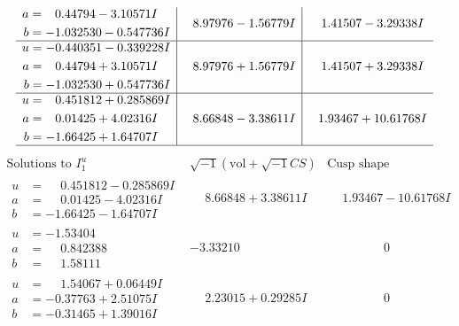 \documentclass[1p]{elsarticle_modified}
\theoremstyle{definition}
\newcommand{\I}{\sqrt{-1}}
\begin{document}
$$\begin{array}{c|c|c}
\begin{aligned}
a &= \phantom{-}0.44794 - 3.10571 I \\
b &= -1.032530 - 0.547736 I\end{aligned}
 & \phantom{-}8.97976 - 1.56779 I & \phantom{-}1.41507 - 3.29338 I \\ \hline\begin{aligned}
u &= -0.440351 - 0.339228 I \\
a &= \phantom{-}0.44794 + 3.10571 I \\
b &= -1.032530 + 0.547736 I\end{aligned}
 & \phantom{-}8.97976 + 1.56779 I & \phantom{-}1.41507 + 3.29338 I \\ \hline\begin{aligned}
u &= \phantom{-}0.451812 + 0.285869 I \\
a &= \phantom{-}0.01425 + 4.02316 I \\
b &= -1.66425 + 1.64707 I\end{aligned}
 & \phantom{-}8.66848 - 3.38611 I & \phantom{-}1.93467 + 10.61768 I\\
 \hline 
 \end{array}$$\newpage$$\begin{array}{c|c|c}  
\text{Solutions to }I^u_{1}& \I (\text{vol} + \sqrt{-1}CS) & \text{Cusp shape}\\
 \hline 
\begin{aligned}
u &= \phantom{-}0.451812 - 0.285869 I \\
a &= \phantom{-}0.01425 - 4.02316 I \\
b &= -1.66425 - 1.64707 I\end{aligned}
 & \phantom{-}8.66848 + 3.38611 I & \phantom{-}1.93467 - 10.61768 I \\ \hline\begin{aligned}
u &= -1.53404\phantom{ +0.000000I} \\
a &= \phantom{-}0.842388\phantom{ +0.000000I} \\
b &= \phantom{-}1.58111\phantom{ +0.000000I}\end{aligned}
 & -3.33210\phantom{ +0.000000I} & \phantom{-0.000000 } 0 \\ \hline\begin{aligned}
u &= \phantom{-}1.54067 + 0.06449 I \\
a &= -0.37763 + 2.51075 I \\
b &= -0.31465 + 1.39016 I\end{aligned}
 & \phantom{-}2.23015 + 0.29285 I & \phantom{-0.000000 } 0 \\ \hline\begin{aligned}

\end{aligned}
\end{array}$$
\end{document}
